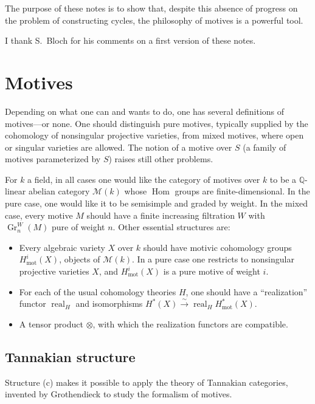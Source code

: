 \documentclass[11pt,a4paper]{article}
\theoremstyle{plain}
\theoremstyle{definition}
\DeclareMathOperator{\Hom}{Hom}
\DeclareMathOperator{\Gr}{Gr}
\newcommand{\Q}{\mathbb{Q}}
\DeclareMathOperator{\mot}{mot}
\DeclareMathOperator{\real}{real}
\begin{document}
\vspace{0.5em}

The purpose of these notes is to show that, despite this absence of progress on the problem of constructing cycles, the philosophy of motives is a powerful tool.

I thank S.~Bloch for his comments on a first version of these notes.

\section{Motives}

Depending on what one can and wants to do, one has several definitions of motives---or none. One should distinguish pure motives, typically supplied by the cohomology of nonsingular projective varieties, from mixed motives, where open or singular varieties are allowed. The notion of a motive over $S$ (a family of motives parameterized by $S$) raises still other problems.

For $k$ a field, in all cases one would like the category of motives over $k$ to be a $\Q$-linear abelian category $\mathcal{M}(k)$ whose $\Hom$ groups are finite-dimensional. In the pure case, one would like it to be semisimple and graded by weight. In the mixed case, every motive $M$ should have a finite increasing filtration $W$ with $\Gr^W_n(M)$ pure of weight $n$. Other essential structures are:

\begin{itemize}
\item[(a)] Every algebraic variety $X$ over $k$ should have motivic cohomology groups $H^i_{\mot}(X)$, objects of $\mathcal{M}(k)$. In a pure case one restricts to nonsingular projective varieties $X$, and $H^i_{\mot}(X)$ is a pure motive of weight $i$.

\item[(b)] For each of the usual cohomology theories $H$, one should have a ``realization'' functor $\real_H$ and isomorphisms $H^*(X)\xrightarrow{\sim}\real_H H^*_{\mot}(X)$.

\item[(c)] A tensor product $\otimes$, with which the realization functors are compatible.
\end{itemize}

\subsection{Tannakian structure}

Structure (c) makes it possible to apply the theory of Tannakian categories, invented by Grothendieck to study the formalism of motives.
\end{document}
